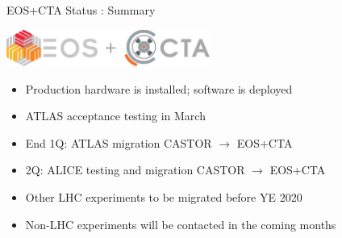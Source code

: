 \documentclass[aspectratio=1610]{beamer}
\begin{document}
\begin{frame}{EOS+CTA Status : Summary}{}
\begin{center}
\includegraphics[width=0.5\textwidth]{../../Logo/Logo_EOS+CTA}
\end{center}

\begin{itemize}
    \item Production hardware is installed; software is deployed
    \item ATLAS acceptance testing in March
    \item End 1Q: ATLAS migration CASTOR $\rightarrow$ EOS+CTA
    \item 2Q: ALICE testing and migration CASTOR $\rightarrow$ EOS+CTA
    \item Other LHC experiments to be migrated before YE 2020
    \item Non-LHC experiments will be contacted in the coming months
\end{itemize}
\end{frame}

\backcover
\end{document}
